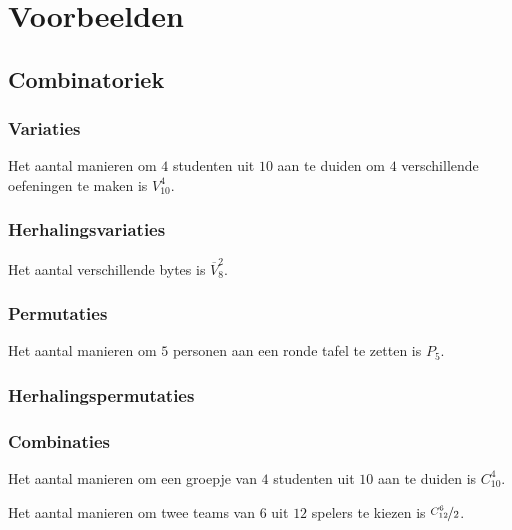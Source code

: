 \documentclass[main.tex]{subfiles}
\begin{document}
\chapter{Voorbeelden}
\label{cha:voorbeelden}



\section{Combinatoriek}
\subsection*{Variaties}
\begin{vb}
  Het aantal manieren om $4$ studenten uit $10$ aan te duiden om $4$ verschillende oefeningen te maken is $V_{10}^{4}$.
\end{vb}

\subsection*{Herhalingsvariaties}
\begin{vb}
  Het aantal verschillende bytes is $\overline{V}_{8}^{2}$.
\end{vb}

\subsection*{Permutaties}
\begin{vb}
  Het aantal manieren om $5$ personen aan een ronde tafel te zetten is $P_{5}$.
\end{vb}

\subsection*{Herhalingspermutaties}

\subsection*{Combinaties}
\begin{vb}  
  Het aantal manieren om een groepje van $4$ studenten uit $10$ aan te duiden is $C^{4}_{10}$.
\end{vb}

\begin{vb}
  Het aantal manieren om twee teams van $6$ uit $12$ spelers te kiezen is $\nicefrac{C^{6}_{12}}{2}$.
\end{vb}
\end{document}
